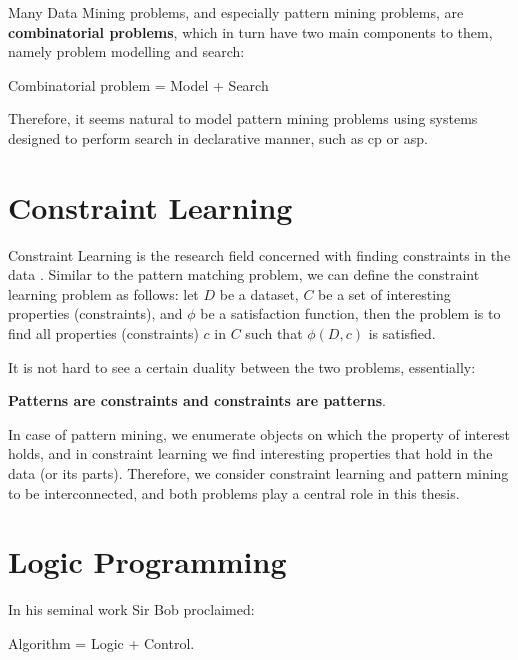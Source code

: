 Many Data Mining problems, and especially pattern mining
problems, are \textbf{combinatorial problems}, which in turn have two main components to them, namely problem modelling and search: 

\begin{center}
  Combinatorial problem = Model + Search
\end{center}

Therefore, it seems natural to model pattern mining problems 
using systems designed to perform search in declarative manner, such as \acrlong{cp} or \acrlong{asp}. %




\section{Constraint Learning}
Constraint Learning is the research field concerned with finding
constraints in the data \parencite{constraint_learning,QUACQ,Conacq}.
Similar to the pattern matching problem, we can define 
the constraint learning problem as follows:
let $D$ be a dataset, $C$ be a set of interesting properties (constraints), and
$\phi$ be a satisfaction function, 
then the problem is to find all properties (constraints) $c$ in $C$ such that $\phi(D,c)$ is satisfied.

It is not hard to see a certain duality between the two problems, essentially:
\begin{center}
  \textbf{Patterns are constraints and constraints are patterns}.
\end{center}

In case of pattern mining, we enumerate objects on which the property
of interest holds, and in constraint learning we find interesting
properties that hold in the data (or its parts).
Therefore, we consider constraint learning and pattern mining to be interconnected, and both problems play a central role in this thesis.

\section{Logic Programming}
In his seminal work Sir Bob \textcite{kowalski} proclaimed:
\begin{center}
  Algorithm = Logic + Control.
\end{center}

